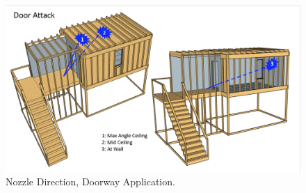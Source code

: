 \documentclass[12pt,oneside]{book}
\begin{document}
\begin{figure}[!ht]
	\centering
	\includegraphics[width=\columnwidth]{Figures/Water_Distribution/Nozzle_Position_Int}
	\caption[Nozzle Direction, Doorway Application]{Nozzle Direction, Doorway Application.}
	\label{fig:Nozzle_Direction_Doorway_Attack}
\end{figure}
\end{document}
